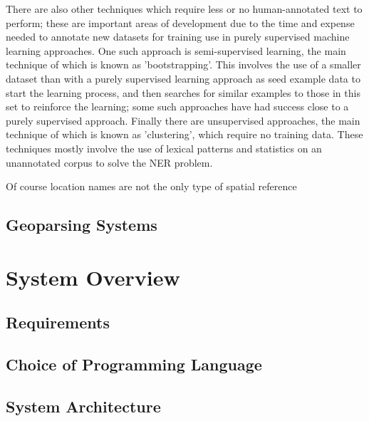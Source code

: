\documentclass[12pt, a4paper]{report}
\begin{document}
There are also other techniques which require less or no human-annotated text to perform; these are important areas of development due to the time and expense needed to annotate new datasets for training use in purely supervised machine learning approaches. One such approach is semi-supervised learning, the main technique of which is known as 'bootstrapping'. This involves the use of a smaller dataset than with a purely supervised learning approach as seed example data to start the learning process, and then searches for similar examples to those in this set to reinforce the learning; some such approaches have had success close to a purely supervised approach. Finally there are unsupervised approaches, the main technique of which is known as 'clustering', which require no training data. These techniques mostly involve the use of lexical patterns and statistics on an unannotated corpus to solve the NER problem.

Of course location names are not the only type of spatial reference


\section{Geoparsing Systems}


\chapter{System Overview}

\section{Requirements}

\section{Choice of Programming Language}

\section{System Architecture}
\end{document}
